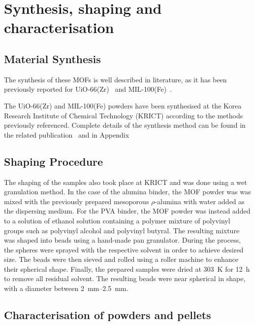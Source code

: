 
\section{Synthesis, shaping and characterisation}

\subsection{Material Synthesis}

The synthesis of these MOFs is well described in literature, 
as it has been previously reported for 
UiO-66(Zr)~\cite{cavkaNewZirconiumInorganic2008} and
MIL-100(Fe)~\cite{YangWaterStableMetalOrganic2013}.

The UiO-66(Zr) and MIL-100(Fe) powders have been synthesised at the
Korea Research Institute of Chemical Technology (KRICT) according 
to the methods previously referenced. Complete details of the 
synthesis method can be found in the related 
publication~\cite{valekarShapingPorousMetal2017}
and in Appendix 

\subsection{Shaping Procedure}

The shaping of the samples also took place at KRICT and was done
using a wet granulation method. In the case of the alumina binder,
the MOF powder was was mixed with the previously prepared mesoporous
\(\rho\)-alumina with water added as the dispersing medium. For the 
PVA binder, the MOF powder was instead added to a solution of 
ethanol solution containing a polymer mixture of polyvinyl groups
such as polyvinyl alcohol and polyvinyl butyral. The resulting 
mixture was shaped into beads using a hand-made pan granulator.
During the process, the spheres were sprayed with the respective 
solvent in order to achieve desired size. The beads were then sieved
and rolled using a roller machine to enhance their spherical
shape. Finally, the prepared samples were dried at \SI{303}{\kelvin}
for \SI{12}{\hour} to remove all residual solvent.
The resulting beads were near spherical in shape, with a diameter
between \SIrange{2}{2.5}{\milli\metre}.

\subsection{Characterisation of powders and pellets}

